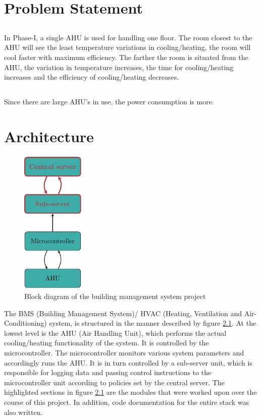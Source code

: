 \documentclass[letterpaper,11pt]{report}
\begin{document}
\newpage
\chapter{Problem Statement}\label{chapter:problemstatement}
\onehalfspacing
\section*{}
In Phase-I, a single AHU is used for handling one floor. The room closest to the AHU will see the least temperature variations in cooling/heating, the room will cool faster with maximum efficiency. The farther the room is situated from the AHU, the variation in temperature increases, the time for cooling/heating increases and the efficiency of cooling/heating decreases.
\section*{}
Since there are large AHU’s in use, the power consumption is more.

\newpage
\chapter{Architecture}\label{chapter:architecture}
\onehalfspacing
\begin{figure}[h]
\includegraphics[width=3cm, height=7cm]{arch}
\centering
\captionsetup{justification=centering}
\caption{Block diagram of the building management system project}
\label{fig:arch}
\end{figure}
The BMS (Building Management System)/ HVAC (Heating, Ventilation and Air-Conditioning) system, is structured in the manner described by figure \ref{fig:arch}. At the lowest level is the AHU (Air Handling Unit), which performs the actual cooling/heating functionality of the system. It is controlled by the microcontroller. The microcontroller monitors various system parameters and accordingly runs the AHU. It is in turn controlled by a sub-server unit, which is responsible for logging data and passing control instructions to the microcontroller unit according to policies set by the central server. The highlighted sections in figure \ref{fig:arch} are the modules that were worked upon over the course of this project. In addition, code documentation for the entire stack was also written.
\end{document}
